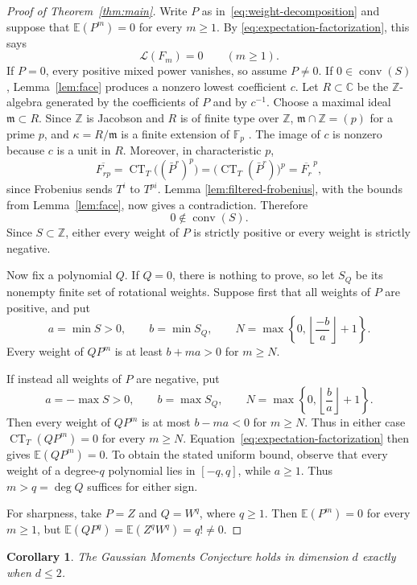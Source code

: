 \documentclass[11pt]{article}
\newtheorem{corollary}[theorem]{Corollary}
\newcommand{\C}{\mathbb C}
\newcommand{\Z}{\mathbb Z}
\newcommand{\E}{\mathbb E}
\newcommand{\CT}{\operatorname{CT}}
\newcommand{\conv}{\operatorname{conv}}
\begin{document}
\begin{proof}[Proof of Theorem~\ref{thm:main}]
Write \(P\) as in~\eqref{eq:weight-decomposition} and suppose that
\(\E(P^m)=0\) for every \(m\geq1\).  By
\eqref{eq:expectation-factorization}, this says
\[
  \mathcal L(F_m)=0\qquad(m\geq1).
\]
If \(P=0\), every positive mixed power vanishes, so assume \(P\neq0\).
If \(0\in\conv(S)\), Lemma~\ref{lem:face} produces a nonzero lowest
coefficient \(c\).  Let \(R\subset\C\) be the \(\Z\)-algebra generated by
the coefficients of \(P\) and by \(c^{-1}\).  Choose a maximal ideal
\(\mathfrak m\subset R\).  Since \(\Z\) is Jacobson and \(R\) is of finite type over \(\Z\),
\(\mathfrak m\cap\Z=(p)\) for a prime \(p\), and
\(\kappa=R/\mathfrak m\) is a finite extension of \(\mathbb F_p\)
\cite[Tags 00GB and 00GC]{StacksProject}.  The image of \(c\) is nonzero because
\(c\) is a unit in \(R\).  Moreover, in characteristic \(p\),
\[
  \overline{F_{rp}}
  =\CT_T\bigl((\bar P^r)^p\bigr)
  =\bigl(\CT_T(\bar P^r)\bigr)^p
  =\overline{F_r}^{\,p},
\]
since Frobenius sends \(T^i\) to \(T^{pi}\).  Lemma
\ref{lem:filtered-frobenius}, with the bounds from Lemma~\ref{lem:face},
now gives a contradiction.  Therefore
\[
  0\notin\conv(S).
\]
Since \(S\subset\Z\), either every weight of \(P\) is strictly positive or
every weight is strictly negative.

Now fix a polynomial \(Q\).  If \(Q=0\), there is nothing to prove, so let
\(S_Q\) be its nonempty finite set of rotational weights.  Suppose first
that all weights of \(P\) are positive, and put
\[
  a=\min S>0,\qquad b=\min S_Q,\qquad
  N=\max\left\{0,\left\lfloor\frac{-b}{a}\right\rfloor+1\right\}.
\]
Every weight of \(QP^m\) is at least \(b+ma>0\) for \(m\geq N\).

If instead all weights of \(P\) are negative, put
\[
  a=-\max S>0,\qquad b=\max S_Q,\qquad
  N=\max\left\{0,\left\lfloor\frac{b}{a}\right\rfloor+1\right\}.
\]
Then every weight of \(QP^m\) is at most \(b-ma<0\) for \(m\geq N\).
Thus in either case \(\CT_T(QP^m)=0\) for every \(m\geq N\).
Equation~\eqref{eq:expectation-factorization} then gives
\(\E(QP^m)=0\).  To obtain the stated uniform bound, observe that every
weight of a degree-\(q\) polynomial lies in \([-q,q]\), while \(a\geq1\).
Thus \(m>q=\deg Q\) suffices for either sign.

For sharpness, take \(P=Z\) and \(Q=W^q\), where \(q\geq1\).  Then
\(\E(P^m)=0\) for every \(m\geq1\), but
\(\E(QP^q)=\E(Z^qW^q)=q!\ne0\).
\end{proof}

\begin{corollary}\label{cor:classification}
The Gaussian Moments Conjecture holds in dimension \(d\) exactly when
\(d\leq2\).
\end{corollary}
\end{document}
